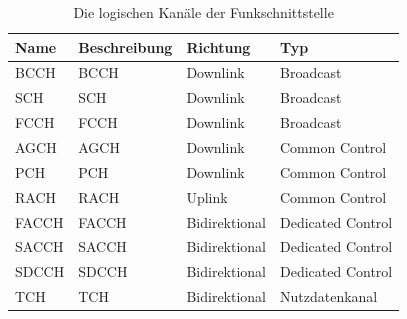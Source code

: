 \begin{table}[H]
\begin{adjustbox}{width={1.00\textwidth}, center}
\begin{tabular}{|l|l|l|l|}
\rowcolor[HTML]{F7F7F7} 
\hline
\textbf{Name} & \textbf{Beschreibung}                 	& \textbf{Richtung} & \textbf{Typ} 	\\ \hline
\acs{BCCH}          & \acl{BCCH}              			& Downlink          & Broadcast    		\\ \hline
\acs{SCH}           & \acl{SCH}               			& Downlink          & Broadcast   		\\ \hline
\acs{FCCH}          & \acl{FCCH}        			  	& Downlink          & Broadcast    		\\ \hline
\acs{AGCH}          & \acl{AGCH}                  		& Downlink          & Common Control       		\\ \hline
\acs{PCH}           & \acl{PCH}                         & Downlink          & Common Control       		\\ \hline
\acs{RACH}          & \acl{RACH}                 		& Uplink            & Common Control       		\\ \hline
\acs{FACCH}         & \acl{FACCH}       				& Bidirektional     & Dedicated Control    		\\ \hline
\acs{SACCH}         & \acl{SACCH}       				& Bidirektional     & Dedicated Control    		\\ \hline
\acs{SDCCH}         & \acl{SDCCH} 						& Bidirektional     & Dedicated Control    		\\ \hline
\acs{TCH}           & \acl{TCH}                       	& Bidirektional     & Nutzdatenkanal  \\ \hline
\end{tabular}
\end{adjustbox}
\caption{Die logischen Kanäle der Funkschnittstelle}\label{tab:logical-channels}
\end{table}

